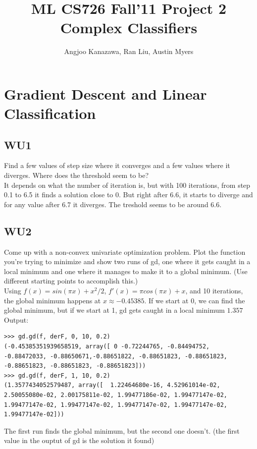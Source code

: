 \documentclass[a4paper,11pt]{article}
\begin{document}
\title{ML CS726 Fall'11 Project 2 Complex Classifiers}
\author{Angjoo Kanazawa, Ran Liu, Austin Myers}
\maketitle


\section{Gradient Descent and Linear Classification}
\subsection{WU1}
\textsf{Find a few values of step size where it converges and a few
  values where it diverges. Where does the threshold seem to be?}\\
It depends on what the number of iteration is, but with 100
iterations, from step 0.1 to 6.5 it finds a solution close to
0. But right after 6.6, it starts to diverge and for any value after
6.7 it diverges. The treshold seems to be around 6.6.

\subsection{WU2}
\textsf{Come up with a non-convex univariate optimization
  problem. Plot the function you're trying to minimize and show two
  runs of gd, one where it gets caught in a local minimum and one
  where it manages to make it to a global minimum. (Use different
  starting points to accomplish this.)}\\
Using $f(x) = sin(\pi x) + x^2/2$, $f'(x) = \pi cos(\pi x) + x$, and
10 iterations, the
global minimum happens at $x\approx -0.45385$.
If we start at 0, we can find the global minimum, but if we start at
1, gd gets caught in a local minimum $1.357$
Output:
\begin{verbatim}
>>> gd.gd(f, derF, 0, 10, 0.2)
(-0.45385351939658519, array([ 0 -0.72244765, -0.84494752, -0.88472033, -0.88650671,-0.88651822, -0.88651823, -0.88651823, -0.88651823, -0.88651823, -0.88651823]))
>>> gd.gd(f, derF, 1, 10, 0.2)
(1.3577434052579487, array([  1.22464680e-16, 4.52961014e-02,
2.50055080e-02, 2.00175811e-02, 1.99477186e-02, 1.99477147e-02,
1.99477147e-02, 1.99477147e-02, 1.99477147e-02, 1.99477147e-02, 1.99477147e-02]))
\end{verbatim}
The first run finds the global minimum, but the second one
doesn't. (the first value in the ouptut of gd is the solution it found)
\end{document}
